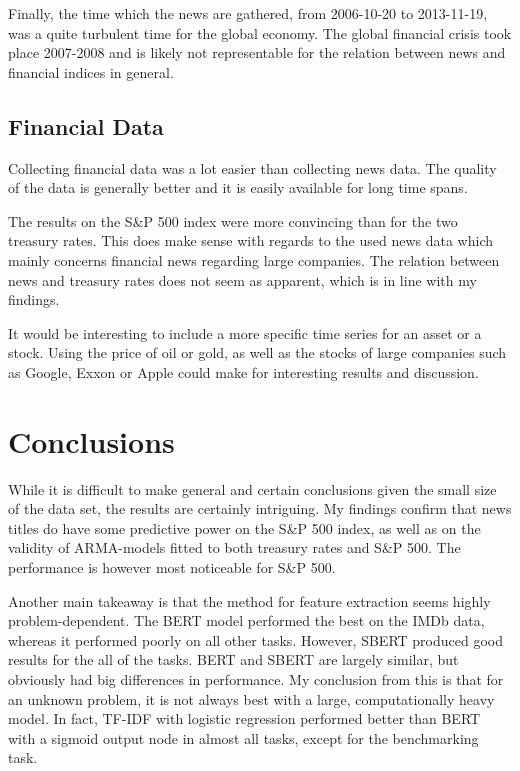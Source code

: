 Finally, the time which the news are gathered, from 2006-10-20 to 2013-11-19, was a quite turbulent time for the global economy. The global financial crisis took place 2007-2008 and is likely not representable for the relation between news and financial indices in general. 

\subsection{Financial Data}

Collecting financial data was a lot easier than collecting news data. The quality of the data is generally better and it is easily available for long time spans. 

The results on the S\&P 500 index were more convincing than for the two treasury rates. This does make sense with regards to the used news data which mainly concerns financial news regarding large companies. The relation between news and treasury rates does not seem as apparent, which is in line with my findings. 

It would be interesting to include a more specific time series for an asset or a stock. Using the price of oil or gold, as well as the stocks of large companies such as Google, Exxon or Apple could make for interesting results and discussion. 

\section{Conclusions}

While it is difficult to make general and certain conclusions given the small size of the data set, the results are certainly intriguing. My findings confirm that news titles do have some predictive power on the S\&P 500 index, as well as on the validity of ARMA-models fitted to both treasury rates and S\&P 500. The performance is however most noticeable for S\&P 500. 

Another main takeaway is that the method for feature extraction seems highly problem-dependent. The BERT model performed the best on the IMDb data, whereas it performed poorly on all other tasks. However, SBERT produced good results for the all of the tasks. BERT and SBERT are largely similar, but obviously had big differences in performance. My conclusion from this is that for an unknown problem, it is not always best with a large, computationally heavy model. In fact, TF-IDF with logistic regression performed better than BERT with a sigmoid output node in almost all tasks, except for the benchmarking task. 


